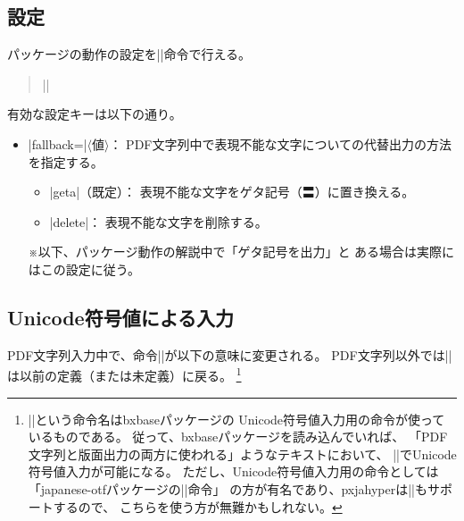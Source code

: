 \documentclass[uplatex,dvipdfmx,a4paper]{jsarticle}
\newcommand{\Pkg}[1]{\textsf{#1}}
\newcommand{\Meta}[1]{$\langle$\mbox{}#1\mbox{}$\rangle$}
\newcommand{\Note}{\par\noindent ※}
\newcommand{\Means}{：\quad}
\begin{document}
\subsection{設定}
\label{ssec:setup}

パッケージの動作の設定を|\pxjahypersetup|命令で行える。

\begin{quote}\small
|\pxjahypersetup{|\Meta{キー}|=|\Meta{値}|,...}|
\end{quote}

有効な設定キーは以下の通り。

\begin{itemize}
\item |fallback=|\Meta{値}\Means
  PDF文字列中で表現不能な文字についての代替出力の方法を指定する。
  \begin{itemize}
  \item |geta|（既定）\Means
    表現不能な文字をゲタ記号（〓）に置き換える。
  \item |delete|\Means
    表現不能な文字を削除する。
  \end{itemize}
  \Note 以下、パッケージ動作の解説中で「ゲタ記号を出力」と
    ある場合は実際にはこの設定に従う。
\end{itemize}

\subsection{Unicode符号値による入力}
\label{ssec:ux-command}

PDF文字列入力中で、命令|\Ux|が以下の意味に変更される。
PDF文字列以外では|\Ux|は以前の定義（または未定義）に戻る。
\footnote{|\Ux|という命令名は\Pkg{bxbase}パッケージの
Unicode符号値入力用の命令が使っているものである。
従って、\Pkg{bxbase}パッケージを読み込んでいれば、
「PDF文字列と版面出力の両方に使われる」ようなテキストにおいて、
|\Ux|でUnicode符号値入力が可能になる。
ただし、Unicode符号値入力用の命令としては
「\Pkg{japanese-otf}パッケージの|\UTF|命令」
の方が有名であり、\Pkg{pxjahyper}は|\UTF|もサポートするので、
こちらを使う方が無難かもしれない。}
\end{document}
